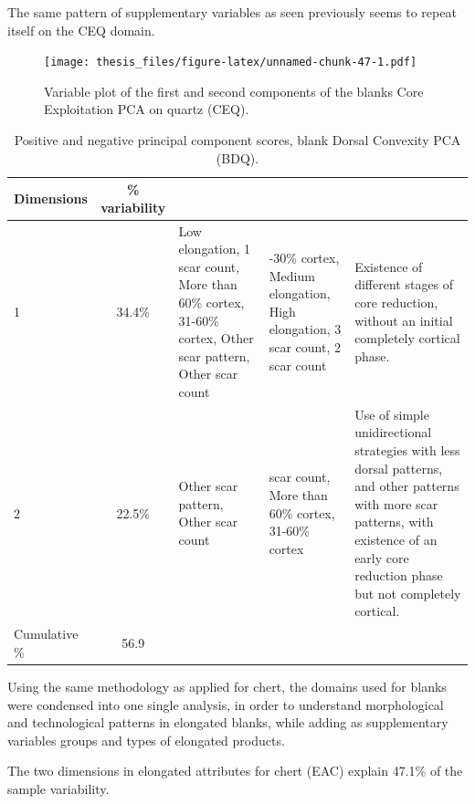 \documentclass[12pt,twoside]{reedthesis}
\begin{document}
The same pattern of supplementary variables as seen previously seems to repeat itself on the CEQ domain.
\begin{figure}
\centering
\texttt{[image: thesis\_files/figure-latex/unnamed-chunk-47-1.pdf]}
\caption{\label{fig:unnamed-chunk-47}Variable plot of the first and second components of the blanks Core Exploitation PCA on quartz (CEQ).}
\end{figure}
\begin{table}

\caption{\label{tab:unnamed-chunk-48}Positive and negative principal component scores, blank Dorsal Convexity PCA (BDQ).}
\centering
\begin{tabular}[t]{lc>{\raggedright\arraybackslash}p{3cm}>{\raggedright\arraybackslash}p{3cm}>{\raggedright\arraybackslash}p{3cm}}
\toprule
\multicolumn{1}{c}{\textbf{Dimensions}} & \multicolumn{1}{c}{\textbf{\% variability}} & \multicolumn{1}{>{\centering\arraybackslash}p{3cm}}{\textbf{+}} & \multicolumn{1}{>{\centering\arraybackslash}p{3cm}}{\textbf{-}} & \multicolumn{1}{>{\centering\arraybackslash}p{3cm}}{\textbf{Interpretation}}\\
\midrule
1 & 34.4\% & Low elongation, 1 scar count, More than 60\% cortex, 31-60\% cortex, Other scar pattern, Other scar count & 1-30\% cortex, Medium elongation, High elongation, 3 scar count, 2 scar count & Existence of different stages of core reduction, without an initial completely cortical phase.\\
2 & 22.5\% & Other scar pattern, Other scar count & 1 scar count, More than 60\% cortex, 31-60\% cortex & Use of simple unidirectional strategies with less dorsal patterns, and other patterns with more scar patterns, with existence of an early core reduction phase but not completely cortical.\\
Cumulative \% & 56.9 &  &  & \\
\bottomrule
\end{tabular}
\end{table}
Using the same methodology as applied for chert, the domains used for blanks were condensed into one single analysis, in order to understand morphological and technological patterns in elongated blanks, while adding as supplementary variables groups and types of elongated products.

The two dimensions in elongated attributes for chert (EAC) explain 47.1\% of the sample variability.
\end{document}
